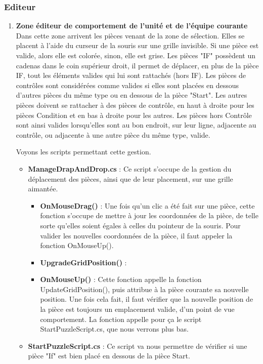 \documentclass{report}
\begin{document}
\subsubsection{Editeur}
\begin{enumerate}[label=\Alph*)]
\item\textbf{Zone éditeur de comportement de l'unité et de l'équipe courante} \newline
Dans cette zone arrivent les pièces venant de la zone de sélection. Elles se placent à l'aide du curseur de la souris sur une grille invisible. Si une pièce est valide, alors elle est colorée, sinon, elle est grise. Les pièces "IF" possèdent un cadenas dans le coin supérieur droit, il permet de déplacer, en plus de la pièce IF, tout les éléments valides qui lui sont rattachés (hors IF). Les pièces de contrôles sont considérées comme valides si elles sont placées en dessous d'autres pièces du même type ou en dessous de la pièce "Start".\newline
Les autres pièces doivent se rattacher à des pièces de contrôle, en haut à droite pour les pièces Condition et en bas à droite pour les autres. Les pièces hors Contrôle sont ainsi valides lorsqu'elles sont au bon endroit, sur leur ligne, adjacente au contrôle, ou adjacente à une autre pièce du même type, valide. \newline \smallbreak

Voyons les scripts permettant cette gestion.

\begin{itemize}
\item\textbf{ManageDrapAndDrop.cs} : \newline 
Ce script s'occupe de la gestion du déplacement des pièces, ainsi que de leur placement, sur une grille aimantée.
\begin{itemize}
\item\textbf{OnMouseDrag()} : \newline
Une fois qu'un clic a été fait sur une pièce, cette fonction s'occupe de mettre à jour les coordonnées de la pièce, de telle sorte qu'elles soient égales à celles du pointeur de la souris. Pour valider les nouvelles coordonnées de la pièce, il faut appeler la fonction OnMouseUp().
\item\textbf{UpgradeGridPosition()} : 
\item\textbf{OnMouseUp()} : \newline
Cette fonction appelle la fonction UpdateGridPosition(), puis attribue à la pièce courante sa nouvelle position. Une fois cela fait, il faut vérifier que la nouvelle position de la pièce est toujours un emplacement valide, d'un point de vue comportement. La fonction appelle pour ça le script StartPuzzleScript.cs, que nous verrons plus bas.
\end{itemize}
\item\textbf{StartPuzzleScript.cs} : \newline
Ce script va nous permettre de vérifier si une pièce "If" est bien placé en dessous de la pièce Start.


\end{itemize}
\end{enumerate}
\end{document}
